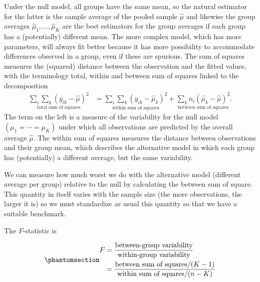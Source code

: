 \documentclass[
  11pt,
  letterpaper,
]{scrbook}
\theoremstyle{definition}
\theoremstyle{definition}
\theoremstyle{remark}
\begin{document}
Under the null model, all groups have the same mean, so the natural
estimator for the latter is the sample average of the pooled sample
\(\widehat{\mu}\) and likewise the group averages
\(\widehat{\mu}_1, \ldots, \widehat{\mu}_K\) are the best estimators for
the group averages if each group has a (potentially) different mean. The
more complex model, which has more parameters, will always fit better
because it has more possibility to accommodate differences observed in a
group, even if these are spurious. The sum of squares measures the
(squared) distance between the observation and the fitted values, with
the terminology total, within and between sum of squares linked to the
decomposition \begin{align*}
\underset{\text{total sum of squares} }{\sum_{i}\sum_{k} (y_{ik} - \widehat{\mu})^2} &= \underset{\text{within sum of squares} }{\sum_i \sum_k (y_{ik} - \widehat{\mu}_k)^2} +  \underset{\text{between sum of squares} }{\sum_k n_i (\widehat{\mu}_k - \widehat{\mu})^2}.
\end{align*} The term on the left is a measure of the variability for
the null model \((\mu_1 = \cdots = \mu_K)\) under which all observations
are predicted by the overall average \(\widehat{\mu}\). The within sum
of squares measures the distance between observations and their group
mean, which describes the alternative model in which each group has
(potentially) a different average, but the same variability.

We can measure how much worst we do with the alternative model
(different average per group) relative to the null by calculating the
between sum of square. This quantity in itself varies with the sample
size (the more observations, the larger it is) so we must standardize as
usual this quantity so that we have a suitable benchmark.

The \(F\)-statistic is

\begin{equation}\phantomsection\label{eq-Fstatheuristic}{
\begin{split}
F &= \frac{\text{between-group variability}}{\text{within-group variability}} \\
&= \frac{\text{between sum of squares}/(K-1)}{\text{within sum of squares}/(n-K)} 
\end{split}
}\end{equation}
\end{document}

